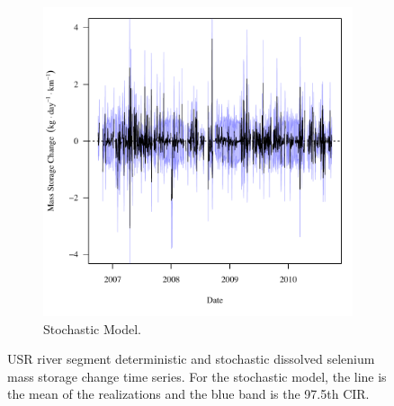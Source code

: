 \begin{landscape}
\begin{figure}
\begin{subfigure}{0.7\textwidth}
			\includegraphics[width=\tableCustomSize]{"Figures/Results_USR/Stochastic/f Segment A"}
			\caption{Stochastic Model.}
		\end{subfigure}
		\caption[USR river segment deterministic and stochastic dissolved selenium mass storage change time series.]{USR river segment deterministic and stochastic dissolved selenium mass storage change time series.  For the stochastic model, the line is the mean of the realizations and the blue band is the 97.5th CIR.}
		\label{fig:massSegmentStoreChange_USR}
	\end{figure}
\end{landscape}

